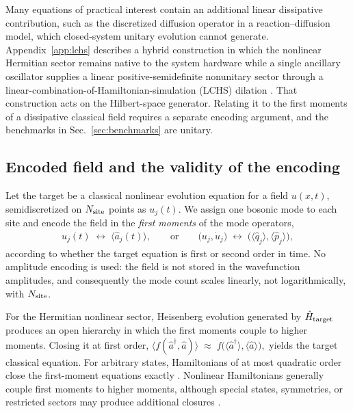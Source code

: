 \documentclass[pra,twocolumn,superscriptaddress,nofootinbib,floatfix]{revtex4-2}
\theoremstyle{remark}
\newcommand{\revcolor}{\color{blue}}
\DeclareRobustCommand{\rev}[1]{{\revcolor #1}}
\begin{document}
\rev{Many equations of practical interest contain an additional linear dissipative contribution, such as the discretized diffusion operator in a reaction--diffusion model, which closed-system unitary evolution cannot generate.} \rev{Appendix~\ref{app:lchs} describes a hybrid construction in which the nonlinear Hermitian sector remains native to the system hardware while a single ancillary oscillator supplies a linear positive-semidefinite nonunitary sector through a linear-combination-of-Hamiltonian-simulation (LCHS) dilation \cite{An_2023,An_2026,das2026quantumdifferentialequationsolver}.} \rev{That construction acts on the Hilbert-space generator.} \rev{Relating it to the first moments of a dissipative classical field requires a separate encoding argument, and the benchmarks in Sec.~\ref{sec:benchmarks} are unitary.}

\subsection{Encoded field and the validity of the encoding}
\label{subsec:encoding}

Let the target be a classical nonlinear evolution equation for a field $u(x,t)$, semidiscretized on $N_{\rm site}$ points as $u_j(t)$. We assign one bosonic mode to each site and encode the field in the \emph{first moments} of the mode operators,
\begin{align}
u_j(t) \;\longleftrightarrow\; \langle \hat a_j(t)\rangle,
\qquad\text{or}\qquad
\bigl(u_j,\dot u_j\bigr) \;\longleftrightarrow\;
\bigl(\langle\hat q_j\rangle,\langle\hat p_j\rangle\bigr),
\label{eq:encoding}
\end{align}
according to whether the target equation is first or second order in time. No amplitude encoding is used: the field is not stored in the wavefunction amplitudes, and consequently the mode count scales linearly, not logarithmically, with $N_{\rm site}$.

For the Hermitian nonlinear sector, Heisenberg evolution generated by $\hat H_{\rm target}$ produces an open hierarchy in which the first moments couple to higher moments. Closing it at first order, \(\bigl\langle f(\hat a^\dagger,\hat a)\bigr\rangle\;\approx\;f\bigl(\langle\hat a^\dagger\rangle,\langle\hat a\rangle\bigr),\) yields the target classical equation. For arbitrary states, Hamiltonians of at most quadratic order close the first-moment equations exactly \cite{Adesso_2014}. Nonlinear Hamiltonians generally couple first moments to higher moments, although special states, symmetries, or restricted sectors may produce additional closures \cite{Plankensteiner_2022}.
\end{document}
